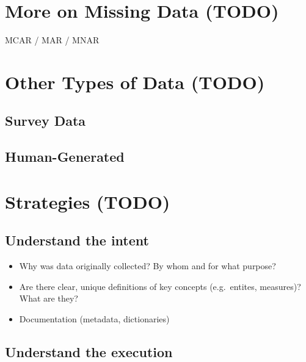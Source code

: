 \documentclass[
]{krantz}
\providecommand{\tightlist}{%
  \setlength{\itemsep}{0pt}\setlength{\parskip}{0pt}}
\begin{document}
\hypertarget{more-on-missing-data-todo}{%
\section{More on Missing Data (TODO)}\label{more-on-missing-data-todo}}

MCAR / MAR / MNAR

\hypertarget{other-types-of-data-todo}{%
\section{Other Types of Data (TODO)}\label{other-types-of-data-todo}}

\hypertarget{survey-data}{%
\subsection{Survey Data}\label{survey-data}}

\hypertarget{human-generated}{%
\subsection{Human-Generated}\label{human-generated}}

\hypertarget{strategies-todo}{%
\section{Strategies (TODO)}\label{strategies-todo}}

\hypertarget{understand-the-intent}{%
\subsection{Understand the intent}\label{understand-the-intent}}

\begin{itemize}
\tightlist
\item
  Why was data originally collected? By whom and for what purpose?
\item
  Are there clear, unique definitions of key concepts (e.g.~entites, measures)? What are they?
\item
  Documentation (metadata, dictionaries)
\end{itemize}

\hypertarget{understand-the-execution}{%
\subsection{Understand the execution}\label{understand-the-execution}}
\end{document}
